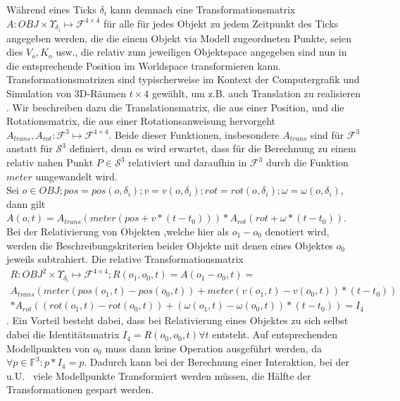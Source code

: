 Während eines Ticks $\delta_i$ kann demnach eine Transformationsmatrix $A: OBJ \times \Upsilon_{\delta_i} \mapsto \mathcal{F}^{4\times 4}$ für alle für jedes Objekt zu jedem Zeitpunkt des Ticks angegeben werden, die die einem Objekt via Modell zugeordneten Punkte, seien dies $V_o, K_o$ usw., die relativ zum jeweiligen Objektspace angegeben sind nun in die entsprechende Position im Worldspace transformieren kann. Transformationsmatrizen sind typischerweise im Kontext der Computergrafik und Simulation von 3D-Räumen $t\times 4$ gewählt, um z.B. auch Translation zu realisieren \cite[ch. 4.4.1, p.76]{fourcrossfour}. Wir beschreiben dazu die 
Translationsmatrix, die aus einer Position, und die Rotationsmatrix, die aus einer Rotationsanweisung hervorgeht $A_{trans}, A_{rot}:\mathcal{F}^3 \mapsto \mathcal{F}^{4\times 4}$. Beide dieser Funktionen, insbesondere $A_{trans}$ sind für $\mathcal{F}^3$ anstatt für $\mathcal{S}^3$ definiert, denn es wird erwartet, dass für die Berechnung zu einem relativ nahen Punkt $P \in\mathcal{S}^3$ relativiert und daraufhin in $\mathcal{F}^3$ durch die Funktion $meter$ umgewandelt wird.\\
Sei $o \in OBJ; pos = pos(o, \delta_i); v = v(o, \delta_i); rot = rot(o, \delta_i); \omega = \omega(o, \delta_i)$, dann gilt
$A(o, t) = A_{trans}(meter(pos + v * (t-t_0))) * A_{rot}(rot + \omega * (t - t_0))$.\\
Bei der Relativierung von Objekten ,welche hier als $o_1 - o_0$ denotiert wird, werden die Beschreibungskriterien beider Objekte mit denen eines Objektes $o_0$ jeweils subtrahiert. Die relative Transformationsmatrix 
\begin{align}
R: OBJ^2 \times \Upsilon_{\delta_i} \mapsto \mathcal{F}^{4\times 4}; R(o_1, o_0, t) = A(o_1 - o_0, t) = \\
A_{trans}( meter(  pos(o_1, t)-pos(o_0, t) ) + meter(v(o_1, t)-v(o_0, t)) * (t-t_0) ) \\
* A_{rot}((rot(o_1, t)-rot(o_0, t)) + (\omega(o_1, t)-\omega(o_0, t)) * (t-t_0))= I_4
\end{align}
. Ein Vorteil besteht dabei, dass bei Relativierung eines Objektes zu sich selbst dabei die Identitätsmatrix $I_4 = R(o_0, o_0, t) \forall t$ entsteht. Auf entsprechenden Modellpunkten von $o_0$ muss dann keine Operation ausgeführt werden, da $\forall p\in \mathbb{F}^3: p*I_4=p$. Dadurch kann bei der Berechnung einer Interaktion, bei der u.U.~ viele Modellpunkte Transformiert werden müssen, die Hälfte der Transformationen gespart werden.

